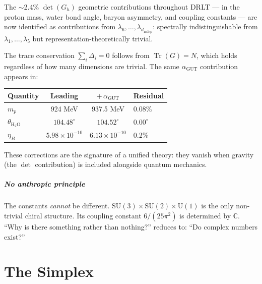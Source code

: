 \documentclass[12pt]{article}
\theoremstyle{remark}
\theoremstyle{definition}
\newcommand{\CC}{\mathbb{C}}
\newcommand{\tr}{\operatorname{Tr}}
\newcommand{\agut}{\alpha_{\mathrm{GUT}}}
\begin{document}
The $\sim$2.4\% $\det(G_h)$ geometric contributions throughout DRLT --- in the proton mass, water bond angle, baryon asymmetry, and coupling constants --- are now identified as contributions from $\lambda_6, \ldots, \lambda_{d_\text{indep}}$: spectrally indistinguishable from $\lambda_1, \ldots, \lambda_5$ but representation-theoretically trivial.

The trace conservation $\sum_i \Delta_i = 0$ follows from $\tr(G) = N$, which holds regardless of how many dimensions are trivial. The same $\agut$ contribution appears in:

\begin{center}
\begin{tabular}{lccl}
\hline
Quantity & Leading & $+\,\agut$ & Residual \\
\hline
$m_p$ & 924 MeV & 937.5 MeV & 0.08\% \\
$\theta_{\text{H}_2\text{O}}$ & $104.48^\circ$ & $104.52^\circ$ & $0.00^\circ$ \\
$\eta_B$ & $5.98 \times 10^{-10}$ & $6.13 \times 10^{-10}$ & 0.2\% \\
\hline
\end{tabular}
\end{center}

These corrections are the signature of a unified theory: they vanish when gravity (the $\det$ contribution) is included alongside quantum mechanics.

\subsubsection{No anthropic principle}

The constants \emph{cannot} be different. $\text{SU}(3)\times\text{SU}(2)\times\text{U}(1)$ is the only non-trivial chiral structure. Its coupling constant $6/(25\pi^2)$ is determined by $\CC$. ``Why is there something rather than nothing?'' reduces to: ``Do complex numbers exist?''



\part{The Simplex}

\end{document}
